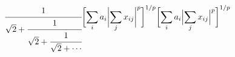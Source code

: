 \documentclass{article}
\begin{document}
\[
  \cfrac{1}{\sqrt{2}+
  \cfrac{1}{\sqrt{2}+
  \cfrac{1}{\sqrt{2}+\dotsb
  }}}
  \\
  \biggl[
  \sum_i a_i\biggl\lvert\sum_j x_{ij}
  \biggr\rvert^p\biggr]^{1/p}
  \\
  \biggl[
  \sum_i a_i\Bigl\lvert\sum_j x_{ij}
  \Bigr\rvert^p\biggr]^{1/p}
\]
\end{document}
